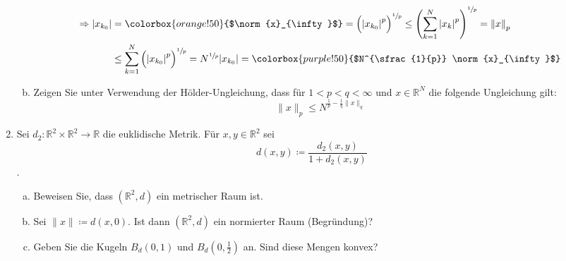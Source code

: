 \documentclass{article}
\begin{document}
\begin{enumerate}[1.]
\begin{enumerate}[a)]
    \begin{align*}
      \Rightarrow \abs{x_{k_0}}
        &= \colorbox{orange!50}{$\norm{x}_{\infty}$} = \qty\Big(\abs{x_{k_0}}^p)^{\sfrac{1}{p}}
          \leq \qty(\sum_{k = 1}^N \abs{x_k}^p)^{\sfrac{1}{p}} = \norm{x}_p \\
        &\leq \sum_{k = 1}^N \qty\Big(\abs{x_{k_0}}^p)^{\sfrac{1}{p}}
          = N^{\sfrac{1}{p}} \abs{x_{k_0}} =\colorbox{purple!50}{$N^{\sfrac{1}{p}} \norm{x}_{\infty}$}
    \end{align*}
    
  \item Zeigen Sie unter Verwendung der Hölder-Ungleichung, dass für
    $1 < p < q < \infty$ und $x \in \mathbb{R}^N$ die folgende Ungleichung
    gilt:
    \[
      \lVert x \rVert_p \leq N^{\frac{1}{p} - \frac{1}{q} \lVert x \rVert_q}
    \]
  \end{enumerate}


\item Sei $d_2 \colon \mathbb{R}^2 \times \mathbb{R}^2 \to \mathbb{R}$ die
  euklidische Metrik. Für $x, y \in \mathbb{R}^2$ sei
  \[
    d(x, y) \coloneqq \frac{d_2(x, y)}{1 + d_2(x, y)}
  \].
  \begin{enumerate}[a)]
  \item Beweisen Sie, dass $\left( \mathbb{R}^2, d \right)$ ein metrischer
    Raum ist.
  \item Sei $\lVert x \rVert \coloneqq d(x, 0)$.
    Ist dann $\left( \mathbb{R}^2, d \right)$ ein normierter Raum (Begründung)?
  \item Geben Sie die Kugeln $B_d(0, 1)$ und $B_d\left( 0, \frac{1}{2} \right)$
    an. Sind diese Mengen \colorbox{purple!20}{konvex}?
  \end{enumerate}
\end{enumerate}
\end{document}
